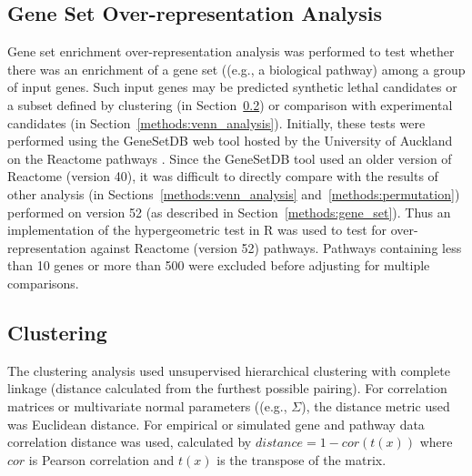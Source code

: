 \subsection{Gene Set Over-representation Analysis} \label{methods:enrichment}
Gene set enrichment over-representation analysis was performed to test whether there was an enrichment of a gene set ((e.g., a biological \gls{pathway}) among a group of input genes. Such input genes may be predicted \gls{synthetic lethal} candidates or a subset defined by clustering (in Section~\ref{methods:clustering}) or comparison with experimental candidates (in Section~\ref{methods:venn_analysis}). Initially, these tests were performed using the GeneSetDB web tool \citep{genesetdb} hosted by the University of Auckland on the Reactome \glspl{pathway} \citep{Reactome}. Since the GeneSetDB tool used an older version of Reactome (version 40), it was difficult to directly compare with the results of other analysis (in Sections~\ref{methods:venn_analysis} and~\ref{methods:permutation}) performed on version 52 (as described in  Section~\ref{methods:gene_set}). Thus an implementation of the hypergeometric test in R \citep{R_core} was used to test for over-representation against Reactome (version 52) \glspl{pathway}. Pathways containing less than 10 genes or more than 500 \citep[as performed in GeneSetDB by][]{genesetdb} were excluded before adjusting for multiple comparisons.

\subsection{Clustering} \label{methods:clustering}
The clustering analysis used unsupervised hierarchical clustering with complete linkage (distance calculated from the furthest possible pairing). For correlation matrices or multivariate normal parameters ((e.g., $\Sigma$), the distance metric used was Euclidean distance. For empirical or simulated gene and \gls{pathway}  data correlation distance was used, calculated by $distance = 1 - cor(t(x))$ where $cor$ is Pearson correlation and $t(x)$ is the transpose of the  matrix. 

